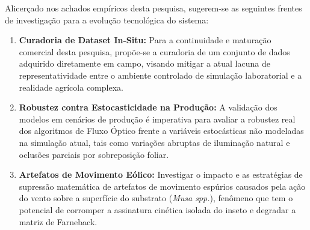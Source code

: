 Alicerçado nos achados empíricos desta pesquisa, sugerem-se as seguintes frentes de investigação para a evolução tecnológica do sistema:
\begin{enumerate}
    \item \textbf{Curadoria de Dataset In-Situ:} Para a continuidade e maturação comercial desta pesquisa, propõe-se a curadoria de um conjunto de dados adquirido diretamente em campo, visando mitigar a atual lacuna de representatividade entre o ambiente controlado de simulação laboratorial e a realidade agrícola complexa.
    \item \textbf{Robustez contra Estocasticidade na Produção:} A validação dos modelos em cenários de produção é imperativa para avaliar a robustez real dos algoritmos de Fluxo Óptico frente a variáveis estocásticas não modeladas na simulação atual, tais como variações abruptas de iluminação natural e oclusões parciais por sobreposição foliar.
    \item \textbf{Artefatos de Movimento Eólico:} Investigar o impacto e as estratégias de supressão matemática de artefatos de movimento espúrios causados pela ação do vento sobre a superfície do substrato (\textit{Musa spp.}), fenômeno que tem o potencial de corromper a assinatura cinética isolada do inseto e degradar a matriz de Farneback.
\end{enumerate}
